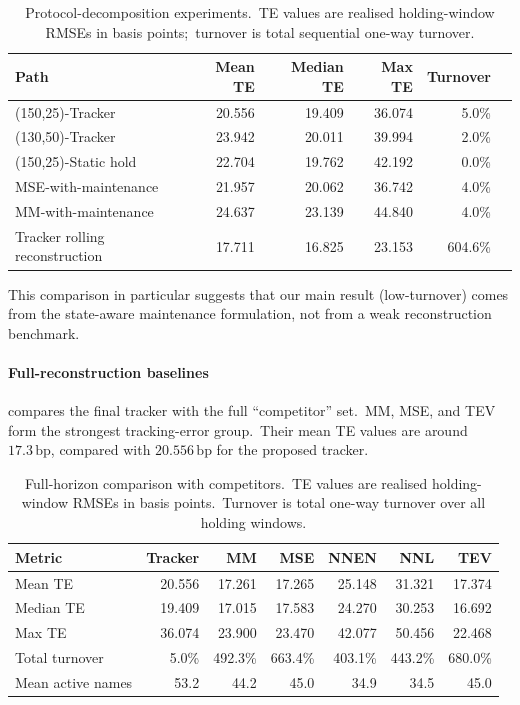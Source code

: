 \documentclass[11pt]{article}
\newcommand{\bp}{\ensuremath{\,\mathrm{bp}}}
\begin{document}
\begin{table}[htbp]
\centering
\caption{Protocol-decomposition experiments.\ TE values are realised holding-window RMSEs in basis points;\ turnover is total sequential one-way turnover.}
\label{tab:protocol-decomposition-main}
\small
\begin{tabular}{lrrrrl}
\toprule
Path & Mean TE & Median TE & Max TE & Turnover\\
\midrule
(150,25)-Tracker & 20.556 & 19.409 & 36.074 & 5.0\%\\
(130,50)-Tracker & 23.942 & 20.011 & 39.994 & 2.0\%\\
(150,25)-Static hold & 22.704 & 19.762 & 42.192 & 0.0\% \\
MSE-with-maintenance & 21.957 & 20.062 & 36.742 & 4.0\%\\
MM-with-maintenance & 24.637 & 23.139 & 44.840 & 4.0\%\\
Tracker rolling reconstruction & 17.711 & 16.825 & 23.153 & 604.6\% \\
\bottomrule
\end{tabular}
\end{table}

\FloatBarrier

This comparison in particular suggests that our main result (low-turnover) comes from the state-aware maintenance formulation, not from a weak reconstruction benchmark.


\paragraph{Full-reconstruction baselines}

 compares the final tracker with the full ``competitor'' set.\ MM, MSE, and TEV form the strongest tracking-error group.\ Their mean TE values are around $17.3\bp$, compared with $20.556\bp$ for the proposed tracker.\ 

\begin{table}[htbp]
\centering
\caption{Full-horizon comparison with competitors.\ TE values are realised holding-window RMSEs in basis points.\ Turnover is total one-way turnover over all holding windows.}
\label{tab:competitors}
\begin{tabular}{lrrrrrr}
\toprule
Metric 
& Tracker 
& MM
& MSE 
& NNEN 
& NNL 
& TEV \\
\midrule
Mean TE        & 20.556 & 17.261 & 17.265 & 25.148 & 31.321 & 17.374 \\
Median TE      & 19.409 & 17.015 & 17.583 & 24.270 & 30.253 & 16.692 \\
Max TE         & 36.074 & 23.900 & 23.470 & 42.077 & 50.456 & 22.468 \\
Total turnover & 5.0\%  & 492.3\% & 663.4\% & 403.1\% & 443.2\% & 680.0\% \\
Mean active names     & 53.2     & 44.2    & 45.0    & 34.9    & 34.5    & 45.0 \\
\bottomrule
\end{tabular}
\end{table}
\end{document}
